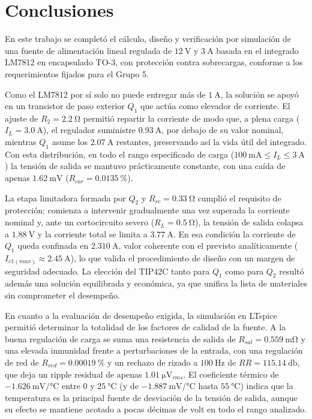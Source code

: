 \chapter{Conclusiones}
\label{sec.c5:conclusiones}

En este trabajo se completó el cálculo, diseño y verificación por simulación de una fuente de alimentación
lineal regulada de $\SI{12}{\volt}$ y $\SI{3}{\ampere}$ basada en el integrado LM7812 en encapsulado TO-3,
con protección contra sobrecargas, conforme a los requerimientos fijados para el Grupo 5.

Como el LM7812 por sí solo no puede entregar más de $\SI{1}{\ampere}$, la solución se apoyó en un transistor de
paso exterior $Q_1$ que actúa como elevador de corriente. El ajuste de $R_2 = \SI{2.2}{\ohm}$ permitió repartir la
corriente de modo que, a plena carga ($I_L = \SI{3.0}{\ampere}$), el regulador suministre $\SI{0.93}{\ampere}$,
por debajo de su valor nominal, mientras $Q_1$ asume los $\SI{2.07}{\ampere}$ restantes, preservando así la vida
útil del integrado. Con esta distribución, en todo el rango especificado de carga
($\SI{100}{\milli\ampere} \le I_L \le \SI{3}{\ampere}$) la tensión de salida se mantuvo prácticamente constante,
con una caída de apenas $\SI{1.62}{\milli\volt}$ ($R_{car} = \SI{0.0135}{\percent}$).

La etapa limitadora formada por $Q_2$ y $R_{sc} = \SI{0.33}{\ohm}$ cumplió el requisito de protección: comienza a
intervenir gradualmente una vez superada la corriente nominal y, ante un cortocircuito severo ($R_L = \SI{0.5}{\ohm}$),
la tensión de salida colapsa a $\SI{1.88}{\volt}$ y la corriente total se limita a $\SI{3.77}{\ampere}$. En esa
condición la corriente de $Q_1$ queda confinada en $\SI{2.310}{\ampere}$, valor coherente con el previsto
analíticamente ($I_{c1(max)} \approx \SI{2.45}{\ampere}$), lo que valida el procedimiento de diseño con un margen
de seguridad adecuado. La elección del TIP42C tanto para $Q_1$ como para $Q_2$ resultó además una solución
equilibrada y económica, ya que unifica la lista de materiales sin comprometer el desempeño.

En cuanto a la evaluación de desempeño exigida, la simulación en LTspice permitió determinar la totalidad de los
factores de calidad de la fuente. A la buena regulación de carga se suma una resistencia de salida de
$R_{sal} = \SI{0.559}{\milli\ohm}$ y una elevada inmunidad frente a perturbaciones de la entrada, con una
regulación de red de $R_{red} = \SI{0.00019}{\percent}$ y un rechazo de rizado a $\SI{100}{\hertz}$ de
$RR = \SI{115.14}{\decibel}$, que deja un ripple residual de apenas $\SI{1.01}{\micro\volt_{rms}}$. El coeficiente
térmico de $\SI{-1.626}{\milli\volt/\celsius}$ entre $0$ y $\SI{25}{\celsius}$ (y de
$\SI{-1.887}{\milli\volt/\celsius}$ hasta $\SI{55}{\celsius}$) indica que la temperatura es la principal fuente de
desviación de la tensión de salida, aunque su efecto se mantiene acotado a pocas décimas de volt en todo el rango
analizado.

